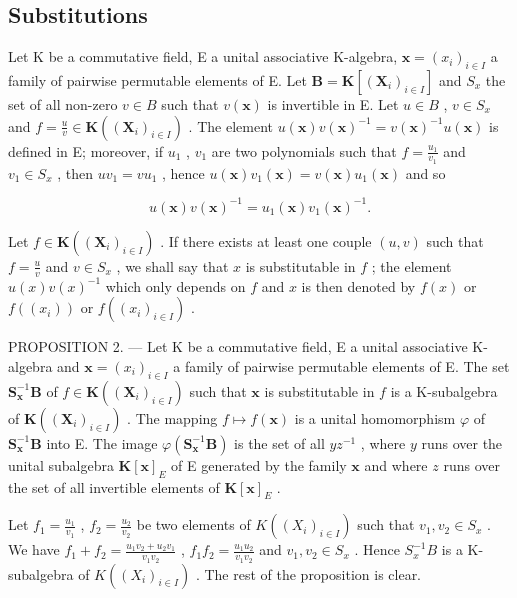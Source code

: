 \subsection{Substitutions}

Let K be a commutative field, E a unital associative K-algebra, \(\mathbf{x} = (x_i)_{i \in I}\) a family of pairwise permutable elements of E. Let \(\mathbf{B} = \mathbf{K}[(\mathbf{X}_i)_{i \in I}]\) and \(S_x\) the set of all non-zero \(v \in B\) such that \(v(\mathbf{x})\) is invertible in E. Let \(u \in B\) , \(v \in S_x\) and \(f = \frac{u}{v} \in \mathbf{K}((\mathbf{X}_i)_{i \in I})\) . The element \(u(\mathbf{x}) v(\mathbf{x})^{-1} = v(\mathbf{x})^{-1} u(\mathbf{x})\) is defined in E; moreover, if \(u_1\) , \(v_1\) are two polynomials such that \(f = \frac{u_1}{v_1}\) and \(v_1 \in S_x\) , then \(uv_1 = vu_1\) , hence \(u(\mathbf{x}) v_1(\mathbf{x}) = v(\mathbf{x}) u_1(\mathbf{x})\) and so

\[
u (\mathbf {x}) v (\mathbf {x}) ^ {- 1} = u _ {1} (\mathbf {x}) v _ {1} (\mathbf {x}) ^ {- 1}.
\]

Let \(f \in \mathbf{K}((\mathbf{X}_i)_{i \in I})\) . If there exists at least one couple \((u, v)\) such that \(f = \frac{u}{v}\) and \(v \in S_x\) , we shall say that \(x\) is substitutable in \(f\) ; the element \(u(x) v(x)^{-1}\) which only depends on \(f\) and \(x\) is then denoted by \(f(x)\) or \(f((x_i))\) or \(f((x_i)_{i \in I})\) .

PROPOSITION 2. --- Let K be a commutative field, E a unital associative K-algebra and \(\mathbf{x} = (x_i)_{i \in I}\) a family of pairwise permutable elements of E. The set \(\mathbf{S}_{\mathbf{x}}^{-1}\mathbf{B}\) of \(f \in \mathbf{K}((\mathbf{X}_i)_{i \in I})\) such that \(\mathbf{x}\) is substitutable in \(f\) is a K-subalgebra of \(\mathbf{K}((\mathbf{X}_i)_{i \in I})\) . The mapping \(f \mapsto f(\mathbf{x})\) is a unital homomorphism \(\varphi\) of \(\mathbf{S}_{\mathbf{x}}^{-1}\mathbf{B}\) into E. The image \(\varphi(\mathbf{S}_{\mathbf{x}}^{-1}\mathbf{B})\) is the set of all \(yz^{-1}\) , where \(y\) runs over the unital subalgebra \(\mathbf{K}[\mathbf{x}]_E\) of E generated by the family \(\mathbf{x}\) and where \(z\) runs over the set of all invertible elements of \(\mathbf{K}[\mathbf{x}]_E\) .

Let \(f_{1} = \frac{u_{1}}{v_{1}}\) , \(f_{2} = \frac{u_{2}}{v_{2}}\) be two elements of \(K((X_{i})_{i\in I})\) such that \(v_{1}, v_{2} \in S_{x}\) . We have \(f_{1} + f_{2} = \frac{u_{1}v_{2} + u_{2}v_{1}}{v_{1}v_{2}}\) , \(f_{1}f_{2} = \frac{u_{1}u_{2}}{v_{1}v_{2}}\) and \(v_{1}, v_{2} \in S_{x}\) . Hence \(S_{x}^{-1}B\) is a K-subalgebra of \(K((X_{i})_{i\in I})\) . The rest of the proposition is clear.

